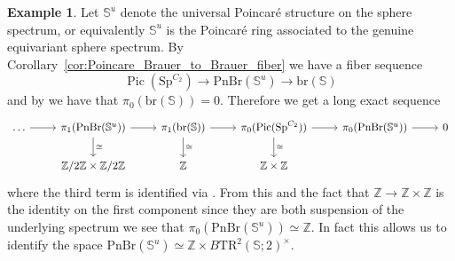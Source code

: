 \documentclass{article}
\DeclareMathOperator{\Pic}{Pic} %
\newcommand{\pnbr}{\ensuremath{\mathrm{PnBr}}}
\newcommand{\pic}{\ensuremath{\mathrm{Pic}}}
\theoremstyle{definition}
\newtheorem{example}[equation]{Example}
\begin{document}
\begin{example}\label{ex: pnbr of sphere}
    Let $\mathbb{S}^u$ denote the universal Poincar{\'e} structure on the sphere spectrum, or equivalently $\mathbb{S}^u$ is the Poincar{\'e} ring associated to the genuine equivariant sphere spectrum. By Corollary~\ref{cor:Poincare_Brauer_to_Brauer_fiber} we have a fiber sequence \[\Pic(\mathrm{Sp}^{C_2})\to \pnbr(\mathbb{S}^u)\to \mathrm{br}(\mathbb{S})\] and by \cite[Corollary 7.17]{Antieau_Gepner_Bruaer} we have that $\pi_0(\mathrm{br}(\mathbb{S}))=0$. Therefore we get a long exact sequence \[
\begin{tikzcd}
\ldots \arrow[r] & \pi_1(\pnbr(\mathbb{S}^u)) \arrow[r] \arrow[d, "\cong"] & \pi_1(\mathrm{br}(\mathbb{S})) \arrow[r] \arrow[d, "\cong"] & \pi_0(\pic(\mathrm{Sp}^{C_2})) \arrow[r] \arrow[d, "\cong"] & \pi_0(\pnbr(\mathbb{S}^u)) \ar[r] & 0 \\
                 & \mathbb{Z}/2\mathbb{Z}\times\mathbb{Z}/2\mathbb{Z}      & \mathbb{Z}                                                  & \mathbb{Z}\times\mathbb{Z}                                  &                            &  
\end{tikzcd}
    \] where the third term is identified via \cite[Section 8.1]{Krause_picard}. From this and the fact that $\mathbb{Z}\to \mathbb{Z}\times \mathbb{Z}$ is the identity on the first component since they are both suspension of the underlying spectrum we see that $\pi_0(\pnbr(\mathbb{S}^u))\simeq \mathbb{Z}$. In fact this allows us to identify the space $\pnbr(\mathbb{S}^u)\simeq \mathbb{Z}\times B\mathrm{TR}^2(\mathbb{S};2)^\times$.
\end{example}
\end{document}

